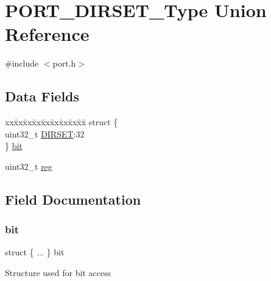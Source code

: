 \hypertarget{union_p_o_r_t___d_i_r_s_e_t___type}{}\section{P\+O\+R\+T\+\_\+\+D\+I\+R\+S\+E\+T\+\_\+\+Type Union Reference}
\label{union_p_o_r_t___d_i_r_s_e_t___type}


{\ttfamily \#include $<$port.\+h$>$}

\subsection*{Data Fields}
\begin{DoxyCompactItemize}
\item 
\begin{tabbing}
xx\=xx\=xx\=xx\=xx\=xx\=xx\=xx\=xx\=\kill
struct \{\\
\>uint32\_t \mbox{\hyperlink{union_p_o_r_t___d_i_r_s_e_t___type_a19aec00ee94c2922f6b709de23b2aa3e}{DIRSET}}:32\\
\} \mbox{\hyperlink{union_p_o_r_t___d_i_r_s_e_t___type_aac450d903b88f77ae57633d76021dafb}{bit}}\\

\end{tabbing}\item 
uint32\+\_\+t \mbox{\hyperlink{union_p_o_r_t___d_i_r_s_e_t___type_a6b91636401516a477989a336376d7b40}{reg}}
\end{DoxyCompactItemize}


\subsection{Field Documentation}
\mbox{\label{union_p_o_r_t___d_i_r_s_e_t___type_aac450d903b88f77ae57633d76021dafb}} 
\subsubsection{\texorpdfstring{bit}{bit}}
{\footnotesize\ttfamily struct \{ ... \}   bit}

Structure used for bit access \mbox{\label{union_p_o_r_t___d_i_r_s_e_t___type_a19aec00ee94c2922f6b709de23b2aa3e}} 
